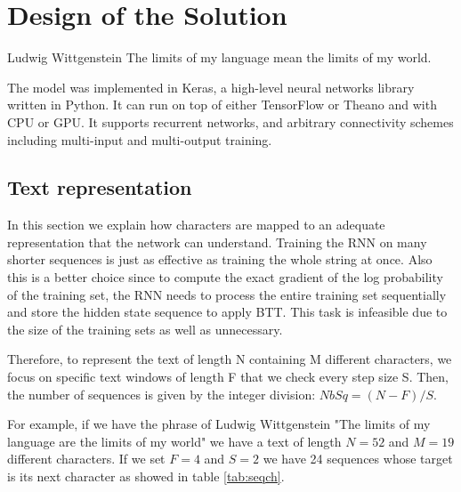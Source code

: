 \chapter{Design of the Solution}
\label{ch:design}

\begin{chapterquote}{Ludwig Wittgenstein}
	The limits of my language mean the limits of my world.
\end{chapterquote}

The model was implemented in Keras, a high-level neural networks library written in Python. It can run on top of either TensorFlow or Theano and with CPU or GPU. It supports recurrent networks, and arbitrary connectivity schemes including multi-input and multi-output training. 

\section{Text representation}

In this section we explain how characters are mapped to an adequate representation that the network can understand. Training the RNN on many shorter sequences is just as effective as training the whole string at once. Also this is a better choice since to compute the exact gradient of the log probability of the training set, the RNN needs to process the entire training set sequentially and store the hidden state sequence to apply BTT. This task is infeasible due to the size of the training sets as well as unnecessary\cite{sutskever2011generating}.

 Therefore, to represent the text of length N containing M different characters, we focus on specific text windows of length F that we check every step size S. Then, the number of sequences is given by the integer division: $NbSq=(N-F)/S$. 

For example, if we have the phrase of Ludwig Wittgenstein "The limits of my language are the limits of my world" we have a text of length $N=52$ and $M=19$ different characters. If we set $F=4$ and $S=2$ we have 24 sequences whose target is its next character as showed in table \ref{tab:seqch}.

